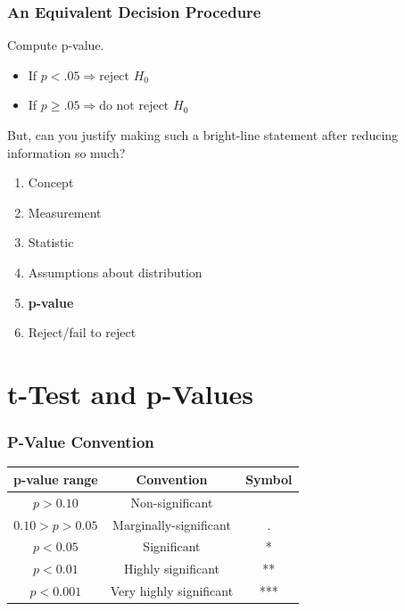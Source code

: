\documentclass[12pt, block=fill]{beamer}
\begin{document}
\begin{frame}
  \frametitle{An Equivalent Decision Procedure}
  
  Compute p-value.
  \begin{itemize}
  \item If $p<.05 \Rightarrow \text{reject } H_0$
  \item If $p\geq.05 \Rightarrow \text{do not reject } H_0$
  \end{itemize}
  But, can you justify making such a bright-line statement after
  reducing information so much?
  \begin{enumerate}
  \item Concept
  \item Measurement
  \item Statistic
  \item Assumptions about distribution
  \item \textbf{p-value}
  \item Reject/fail to reject
  \end{enumerate}
\end{frame}

\section{t-Test and p-Values} 

\begin{frame}
  \frametitle{P-Value Convention}
  
  \begin{center}
    \begin{tabular}{ c | c | c }
      p-value range & Convention  & Symbol \\
      \hline
      $p>0.10$ & Non-significant & \\
      \textcolor{textgray}{  $0.10 > p > 0.05$}  & \textcolor{textgray}{ Marginally-significant  } & . \\
      \hline
      $p<0.05$ & Significant & * \\
      $p<0.01$ & Highly significant & ** \\ 
      $p<0.001$ & Very highly significant & *** \\
    \end{tabular}
  \end{center}
\end{frame}
  
\end{document}
